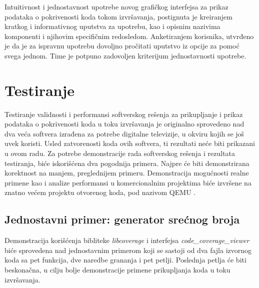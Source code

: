 \documentclass[12pt,oneside]{memoir}
\newcommand{\strano}[1]{\textit{#1}}
\begin{document}
Intuitivnost i jednostavnost upotrebe novog grafičkog interfejsa za prikaz podataka o pokrivenosti koda tokom izvršavanja, postignuta je kreiranjem kratkog i informativnog uputstva za upotrebu, kao i opisnim nazivima komponenti i njihovim specifičnim redosledom. Anketiranjem korisnika, utvrđeno je da je za ispravnu upotrebu dovoljno pročitati uputstvo iz opcije za pomoć svega jednom. Time je potpuno zadovoljen kriterijum jednostavnosti upotrebe. 

\section{Testiranje}

Testiranje validnosti i performansi softverskog rešenja za prikupljanje i prikaz podataka o pokrivenosti koda u toku izvršavanja je originalno sprovedeno nad dva veća softvera izrađena za potrebe digitalne televizije, u okviru kojih se još uvek koristi. Usled zatvorenosti koda ovih softvera, ti rezultati neće biti prikazani u ovom radu. Za potrebe demonstracije rada softverskog rešenja i rezultata testiranja, biće iskorišćena dva pogodnija primera. Najpre će biti demonstrirana korektnost na manjem, preglednijem primeru. Demonstracija mogućnosti realne primene kao i analize performansi u komercionalnim projektima biće izvršene na znatno većem projektu otvorenog koda, pod nazivom QEMU \cite{QEMU}. 

\subsection{Jednostavni primer: generator srećnog broja}
\label{section:lucky}

Demonstracija korišćenja bibliteke \strano{libcoverage} i interfejsa \strano{code\_coverage\_viewer} biće sprovedena nad jednostavnim primerom koji se sastoji od dva fajla izvornog koda sa pet funkcija, dve naredbe grananja i pet petlji. Poslednja petlja će biti beskonačna, u cilju bolje demonstracije primene prikupljanja koda u toku izvršavanja.

\newpage
\end{document}
